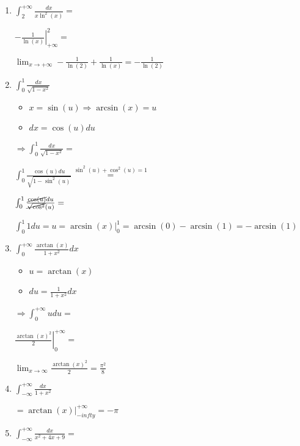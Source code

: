 \documentclass[../practica_08.tex]{subfiles}
\begin{document}
    \begin{enumerate}
        \item $\int_{2}^{+\infty} \frac{dx}{x\ln^2(x)} = $
        
            $ \left. -\frac{1}{\ln(x)} \right |_{+\infty}^2 = $
            
            $\lim_{x \to +\infty} -\frac{1}{\ln(2)} + \frac{1}{\ln(x)} = -\frac{1}{\ln(2)}$
        
        \item $\int_0^1 \frac{dx}{\sqrt{1-x^2}}$

            \begin{itemize}
                \item $x = \sin(u) \Rightarrow \arcsin(x) = u$
                \item $dx = \cos(u)du$
            \end{itemize}

            $\Rightarrow \int_0^1 \frac{dx}{\sqrt{1-x^2}} = $

            $ \int_0^1 \frac{\cos(u)du}{\sqrt{1-\sin^2(u)}} \stackrel{\sin^2(u)+\cos^2(u)=1}{=} $

            $ \int_0^1 \frac{\cancel{\cos(u)}du}{\cancel{\sqrt{\cos^2}}(u)} = $

            $ \int_0^1 1 du = u = \left. \arcsin(x) \right |_0^1 = \arcsin(0) - \arcsin(1) = - \arcsin(1)$

        \item $\int_0^{+\infty} \frac{\arctan(x)}{1+x^2} dx$
        
            \begin{itemize}
                \item $u = \arctan(x)$
                \item $du = \frac{1}{1+x^2} dx$
            \end{itemize}

            $\Rightarrow \int_0^{+\infty} u du =$

            $\left. \frac{\arctan(x)^2}{2} \right |_0^{+\infty} = $

            $ \lim_{x\to \infty} \frac{\arctan(x)^2}{2} = \frac{\pi^2}{8} $

        \item $\int_{-\infty}^{+\infty} \frac{dx}{1+x^2}$
        
            $ = \left. \arctan(x) \right |_{-infty}^{+\infty} = -\pi $

        \item $\int_{-\infty}^{+\infty} \frac{dx}{x^2+4x+9} = $
        

\end{enumerate}
\end{document}

